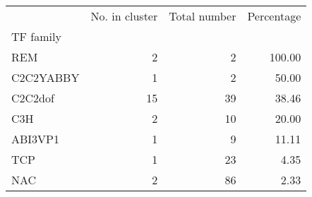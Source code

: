 \begin{tabular}{lrrr}
\toprule
{} &  No. in cluster &  Total number &  Percentage \\
TF family &                 &               &             \\
\midrule
REM       &               2 &             2 &      100.00 \\
C2C2YABBY &               1 &             2 &       50.00 \\
C2C2dof   &              15 &            39 &       38.46 \\
C3H       &               2 &            10 &       20.00 \\
ABI3VP1   &               1 &             9 &       11.11 \\
TCP       &               1 &            23 &        4.35 \\
NAC       &               2 &            86 &        2.33 \\
\bottomrule
\end{tabular}
